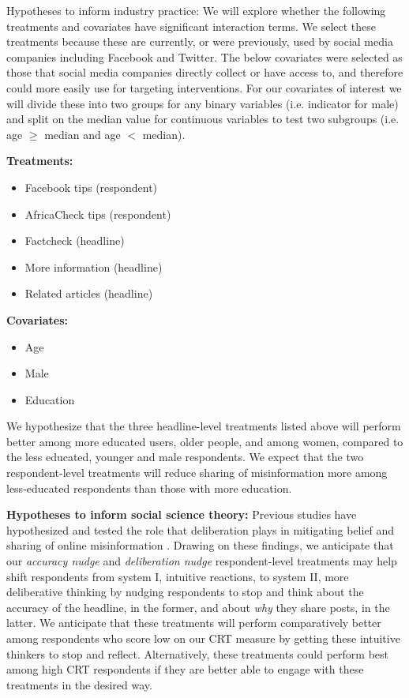 \documentclass[letterpaper, 12pt, parskip=full,DIV=10]{scrartcl}
\begin{document}
Hypotheses to inform industry practice:
We will explore whether the following treatments and covariates have significant interaction terms. We select these treatments because these are currently, or were previously, used by social media companies including Facebook and Twitter. The below covariates were selected as those that social media companies directly collect or have access to, and therefore could more easily use for targeting interventions. For our covariates of interest we will divide these into two groups for any binary variables (i.e. indicator for male) and split on the median value for continuous variables to test two subgroups (i.e. age $\geq$ median and age $<$ median). 

\textbf{Treatments:}
\begin{itemize}
\item Facebook tips (respondent)
\item AfricaCheck tips (respondent)
\item Factcheck (headline)
\item More information (headline)
\item Related articles (headline)
\end{itemize}

\textbf{Covariates:}
\begin{itemize}
\item Age
\item Male
\item Education
\end{itemize}

We hypothesize that the three headline-level treatments listed above will perform better among more educated users, older people, and among women, compared to the less educated, younger and male respondents. We expect that the two respondent-level treatments will reduce sharing of misinformation more among less-educated respondents than those with more education. %

\textbf{Hypotheses to inform social science theory:} Previous studies have hypothesized and tested the role that deliberation plays in mitigating belief and sharing of online misinformation \citep{bago2020fake,pennycook2020fighting}. Drawing on these findings, we anticipate that our \textit{accuracy nudge} and \textit{deliberation nudge} respondent-level treatments may help shift respondents from system I, intuitive reactions, to system II, more deliberative thinking by nudging respondents to stop and think about the accuracy of the headline, in the former, and about \textit{why} they share posts, in the latter. We anticipate that these treatments will perform comparatively better among respondents who score low on our CRT measure by getting these intuitive thinkers to stop and reflect. Alternatively, these treatments could perform best among high CRT respondents if they are better able to engage with these treatments in the desired way. 
\end{document}
